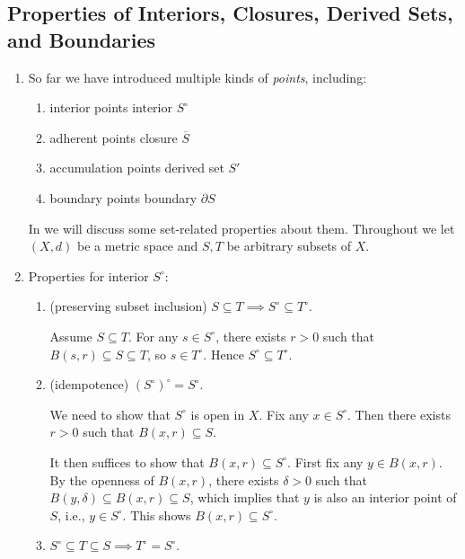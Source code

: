 \subsection{Properties of Interiors, Closures, Derived Sets, and Boundaries}
\label{subsect:int-clos-deriv-bound-prop}
\begin{enumerate}
\item So far we have introduced multiple kinds of \emph{points}, including:
\begin{enumerate}
\item interior points  interior \(S^{\circ}\)
\item adherent points  closure \(\overline{S}\)
\item accumulation points  derived set \(S'\)
\item boundary points  boundary \(\partial S\)
\end{enumerate}
In  we will discuss some set-related
properties about them. Throughout we let \((X,d)\) be a metric space and
\(S,T\) be arbitrary subsets of \(X\).

\item \label{it:interior-set-prop}
Properties for interior \(S^{\circ}\):
\begin{enumerate}
\item\label{it:int-pre-subset} (preserving subset inclusion) \(S\subseteq
T\implies S^{\circ}\subseteq T^{\circ}\).

\begin{pf}
Assume \(S\subseteq T\). For any \(s\in S^{\circ}\), there exists \(r>0\) such
that \(B(s,r)\subseteq S\subseteq T\), so \(s\in T^{\circ}\). Hence
\(S^{\circ}\subseteq T^{\circ}\).
\end{pf}
\item \label{it:int-idempot} (idempotence) \((S^{\circ})^{\circ}=S^{\circ}\).

\begin{pf}
We need to show that \(S^{\circ}\) is open in \(X\). Fix any \(x\in
S^{\circ}\). Then there exists \(r>0\) such that \(B(x,r)\subseteq S\).

It then suffices to show that \(B(x,r)\subseteq S^{\circ}\). First fix any
\(y\in B(x,r)\). By the openness of \(B(x,r)\), there exists \(\delta>0\) such
that \(B(y,\delta)\subseteq B(x,r)\subseteq S\), which implies that \(y\) is
also an interior point of \(S\), i.e., \(y\in S^{\circ}\). This shows
\(B(x,r)\subseteq S^{\circ}\).
\end{pf}
\item \(S^{\circ}\subseteq T\subseteq S\implies T^{\circ}=S^{\circ}\).


\end{enumerate}
\end{enumerate}
